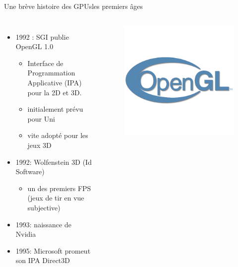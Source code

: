 \documentclass[11pt,mathserif]{beamer}
\begin{document}
\begin{frame}{Une brève histoire des GPUs}{les premiers âges}
  \begin{columns}[t]
    \column{7cm}
    \begin{itemize}[<+->]
      \item 1992 : SGI publie OpenGL 1.0 
        \begin{itemize}
          \item Interface de Programmation Applicative (IPA) pour 
            la 2D et 3D.
         \item initialement prévu pour Uni
         \item vite adopté pour les jeux 3D
         \end{itemize}
      \item 1992: Wolfenstein 3D (Id Software)
        \begin{itemize}
          \item un des premiers FPS (jeux de tir en vue subjective)
            \href{https://classicreload.com/wolfenstein-3d.html}{}
         \end{itemize}
      \item 1993: naissance de Nvidia
      \item 1995: Microsoft promeut son IPA Direct3D 
    \end{itemize} 
    \column{5cm}
\begin{figure}[htbp]
  \includegraphics[width=0.7\linewidth]{fig/opengl.png}
 \end{figure}

\end{columns}
\end{frame}
\end{document}
